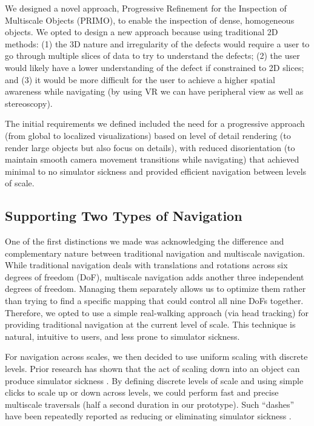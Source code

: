 We designed a novel approach, Progressive Refinement for the Inspection of Multiscale Objects (PRIMO), to enable the inspection of dense, homogeneous objects. We opted to design a new approach because using traditional 2D methods: (1) the 3D nature and irregularity of the defects would require a user to go through multiple slices of data to try to understand the defects; (2) the user would likely have a lower understanding of the defect if constrained to 2D slices; and (3) it would be more difficult for the user to achieve a higher spatial awareness while navigating (by using VR we can have peripheral view as well as stereoscopy).

The initial requirements we defined included the need for a progressive approach (from global to localized visualizations) based on level of detail rendering (to render large objects but also focus on details), with reduced disorientation (to maintain smooth camera movement transitions while navigating) that achieved minimal to no simulator sickness and provided efficient navigation between levels of scale.

\subsection{Supporting Two Types of Navigation}
One of the first distinctions we made was acknowledging the difference and complementary nature between traditional navigation and multiscale navigation. While traditional navigation deals with translations and rotations across six degrees of freedom (DoF), multiscale navigation adds another three independent degrees of freedom. Managing them separately allows us to optimize them rather than trying to find a specific mapping that could control all nine DoFs together. Therefore, we opted to use a simple real-walking approach (via head tracking) for providing traditional navigation at the current level of scale. This technique is natural, intuitive to users, and less prone to simulator sickness.

For navigation across scales, we then decided to use uniform scaling with discrete levels. Prior research has shown that the act of scaling down into an object can produce simulator sickness \cite{krekhov_gullivr_2018, piumsomboon_superman_2018, cmentowski_outstanding_2019, abtahi_im_2019}. By defining discrete levels of scale and using simple clicks to scale up or down across levels, we could perform fast and precise multiscale traversals (half a second duration in our prototype). Such ``dashes'' have been repeatedly reported as reducing or eliminating simulator sickness \cite{krekhov_gullivr_2018, cmentowski_outstanding_2019}.

